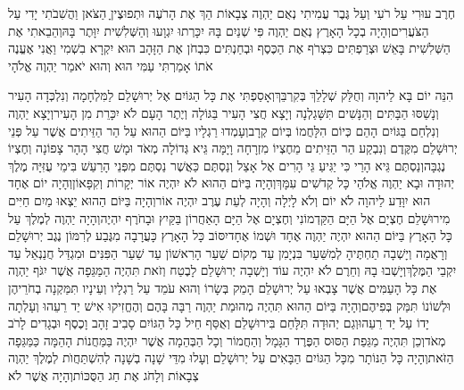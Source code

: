 \documentclass[../main/main.tex]{subfiles}
\begin{document}
\begin{multicols}{\ncols}
חֶרֶב עוּרִי עַל רֹעִי וְעַל גֶּבֶר עֲמִיתִי נְאֻם יַהְוֶה צְבָאוֹת הַךְ אֶת הָרֹעֶה וּתְפוּצֶיןָ הַצֹּאן וַהֲשִׁבֹתִי יָדִי עַל הַצֹּעֲרִים\PreVerseSpace{}וְהָיָה בְכָל הָאָרֶץ נְאֻם יַהְוֶה פִּי שְׁנַיִם בָּהּ יִכָּרְתוּ יִגְוָעוּ וְהַשְּׁלִשִׁית יִוָּתֶר בָּהּ\PreVerseSpace{}וְהֵבֵאתִי אֶת הַשְּׁלִשִׁית בָּאֵשׁ וּצְרַפְתִּים כִּצְרֹף אֶת הַכֶּסֶף וּבְחַנְתִּים כִּבְחֹן אֶת הַזָּהָב הוּא יִקְרָא בִשְׁמִי וַאֲנִי אֶעֱנֶה אֹתוֹ אָמַרְתִּי עַמִּי הוּא וְהוּא יֹאמַר יַהְוֶה אֱלֹהָי\OpenSection{}\par
{}הִנֵּה יוֹם בָּא לַיהוָה וְחֻלַּק שְׁלָלֵךְ בְּקִרְבֵּךְ\PreVerseSpace{}וְאָסַפְתִּי אֶת כָּל הַגּוֹיִם אֶל יְרוּשָׁלֵם לַמִּלְחָמָה וְנִלְכְּדָה הָעִיר וְנָשַׁסּוּ הַבָּתִּים וְהַנָּשִׁים תִּשָּׁגַלְנָה וְיָצָא חֲצִי הָעִיר בַּגּוֹלָה וְיֶתֶר הָעָם לֹא יִכָּרֵת מִן הָעִיר\PreVerseSpace{}וְיָצָא יַהְוֶה וְנִלְחַם בַּגּוֹיִם הָהֵם כְּיוֹם הִלָּחֲמוֹ בְּיוֹם קְרָב\PreVerseSpace{}וְעָמְדוּ רַגְלָיו בַּיּוֹם הַהוּא עַל הַר הַזֵּיתִים אֲשֶׁר עַל פְּנֵי יְרוּשָׁלֵם מִקֶּדֶם וְנִבְקַע הַר הַזֵּיתִים מֵחֶצְיוֹ מִזְרָחָה וָיָמָּה גֵּיא גְּדוֹלָה מְאֹד וּמָשׁ חֲצִי הָהָר צָפוֹנָה וְחֶצְיוֹ נֶגְבָּה\PreVerseSpace{}וְנַסְתֶּם גֵּיא הָרַי כִּי יַגִּיעַ גֵּי הָרִים אֶל אָצַל וְנַסְתֶּם כַּאֲשֶׁר נַסְתֶּם מִפְּנֵי הָרַעַשׁ בִּימֵי עֻזִּיָּה מֶלֶךְ יְהוּדָה וּבָא יַהְוֶה אֱלֹהַי כָּל קְדֹשִׁים עִמָּךְ\PreVerseSpace{}וְהָיָה בַּיּוֹם הַהוּא לֹא יִהְיֶה אוֹר יְקָרוֹת וְקִפָּאוֹן\SubEnd{}\PreVerseSpace{}וְהָיָה יוֹם אֶחָד הוּא יִוָּדַע לַיהוָה לֹא יוֹם וְלֹא לָיְלָה וְהָיָה לְעֵת עֶרֶב יִהְיֶה אוֹר\PreVerseSpace{}וְהָיָה בַּיּוֹם הַהוּא יֵצְאוּ מַיִם חַיִּים מִירוּשָׁלֵם חֶצְיָם אֶל הַיָּם הַקַּדְמוֹנִי וְחֶצְיָם אֶל הַיָּם הָאַחֲרוֹן בַּקַּיִץ וּבָחֹרֶף יִהְיֶה\PreVerseSpace{}וְהָיָה יַהְוֶה לְמֶלֶךְ עַל כָּל הָאָרֶץ בַּיּוֹם הַהוּא יִהְיֶה יַהְוֶה אֶחָד וּשְׁמוֹ אֶחָד\PreVerseSpace{}יִסּוֹב כָּל הָאָרֶץ כָּעֲרָבָה מִגֶּבַע לְרִמּוֹן נֶגֶב יְרוּשָׁלֵם וְרָאֲמָה וְיָשְׁבָה תַחְתֶּיהָ לְמִשַּׁעַר בִּנְיָמִן עַד מְקוֹם שַׁעַר הָרִאשׁוֹן עַד שַׁעַר הַפִּנִּים וּמִגְדַּל חֲנַנְאֵל עַד יִקְבֵי הַמֶּלֶךְ\PreVerseSpace{}וְיָשְׁבוּ בָהּ וְחֵרֶם לֹא יִהְיֶה עוֹד וְיָשְׁבָה יְרוּשָׁלֵם לָבֶטַח \ClosedSection{}וְזֹאת תִּהְיֶה הַמַּגֵּפָה אֲשֶׁר יִגֹּף יַהְוֶה אֶת כָּל הָעַמִּים אֲשֶׁר צָבְאוּ עַל יְרוּשָׁלֵם הָמֵק בְּשָׂרוֹ וְהוּא עֹמֵד עַל רַגְלָיו וְעֵינָיו תִּמַּקְנָה בְחֹרֵיהֶן וּלְשׁוֹנוֹ תִּמַּק בְּפִיהֶם\PreVerseSpace{}וְהָיָה בַּיּוֹם הַהוּא תִּהְיֶה מְהוּמַת יַהְוֶה רַבָּה בָּהֶם וְהֶחֱזִיקוּ אִישׁ יַד רֵעֵהוּ וְעָלְתָה יָדוֹ עַל יַד רֵעֵהוּ\PreVerseSpace{}וְגַם יְהוּדָה תִּלָּחֵם בִּירוּשָׁלֵם וְאֻסַּף חֵיל כָּל הַגּוֹיִם סָבִיב זָהָב וָכֶסֶף וּבְגָדִים לָרֹב מְאֹד\PreVerseSpace{}וְכֵן תִּהְיֶה מַגֵּפַת הַסּוּס הַפֶּרֶד הַגָּמָל וְהַחֲמוֹר וְכָל הַבְּהֵמָה אֲשֶׁר יִהְיֶה בַּמַּחֲנוֹת הָהֵמָּה כַּמַּגֵּפָה הַזֹּאת\PreVerseSpace{}וְהָיָה כָּל הַנּוֹתָר מִכָּל הַגּוֹיִם הַבָּאִים עַל יְרוּשָׁלֵם וְעָלוּ מִדֵּי שָׁנָה בְשָׁנָה לְהִשְׁתַּחֲוֺת לְמֶלֶךְ יַהְוֶה צְבָאוֹת וְלָחֹג אֶת חַג הַסֻּכּוֹת\PreVerseSpace{}וְהָיָה אֲשֶׁר לֹא 
\end{multicols}
\end{document}
